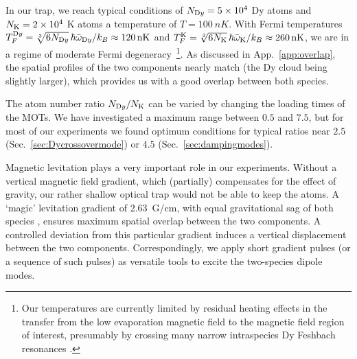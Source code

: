 In our trap, we reach typical conditions of $N_{\textrm Dy} = 5\times10^4$ Dy atoms and $N_{\textrm K} = 2\times10^4$ K atoms a temperature of $T = \SI{100}{nK}$. With Fermi temperatures 
$T_F^{\textrm Dy} = \sqrt[3]{6N_{\textrm Dy}} \, \hbar \bar{\omega}_{\textrm Dy} / k_B
\approx \SI{120}{nK}$ and 
$T_F^{\textrm K} = \sqrt[3]{6N_{\textrm K}} \, \hbar \bar{\omega}_{\textrm K} / k_B \approx \SI{260}{nK}$, we are in a regime of moderate Fermi degeneracy~\footnote{Our temperatures are currently limited by residual heating effects in the transfer from the low evaporation magnetic field to the magnetic field region of interest, presumably by crossing many narrow intraspecies Dy Feshbach resonances \cite{Soave2022lff}.
}.
As discussed in App.~\ref{app:overlap}, the spatial profiles of the two components nearly match (the Dy cloud being slightly larger), which provides us with a good overlap between both species.

The atom number ratio $N_{\textrm Dy}/N_{\textrm K}$ can be varied by changing the loading times of the MOTs. We have investigated a maximum range between $0.5$ and $7.5$, but for most of our experiments we found optimum conditions for typical ratios 
near $2.5$ (Sec.~\ref{sec:Dycrossovermode}) or $4.5$ (Sec.~\ref{sec:dampingmodes}).

Magnetic levitation \cite{Weber2003bec, Ravensbergen2018poa} plays a very important role in our experiments. Without a vertical magnetic field gradient, which (partially) compensates for the effect of gravity, our rather shallow optical trap would not be able to keep the atoms. A `magic' levitation gradient of \SI{2.63}{G/cm}, with equal gravitational sag of both species \cite{Lous2017toa, Soave2023otf}, ensures maximum spatial overlap between the two components. A controlled deviation from this particular gradient induces a vertical displacement between the two components. Correspondingly, we apply short gradient pulses (or a sequence of such pulses) as versatile tools to excite the two-species dipole modes. 



